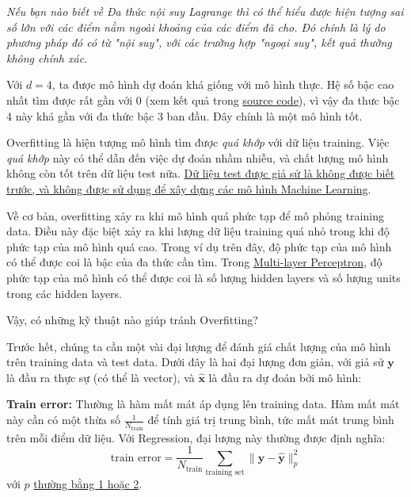 \textit{Nếu bạn nào biết về Đa thức nội suy Lagrange thì có thể hiểu được hiện tượng sai số lớn với các điểm nằm ngoài khoảng của các điểm đã cho. Đó chính là lý do phương pháp đó có từ "nội suy", với các trường hợp "ngoại suy", kết quả thường không chính xác.} 
 
Với $d = 4$, ta được mô hình dự đoán khá giống với mô hình thực. Hệ số bậc cao nhất tìm được rất gần với 0 (xem kết quả trong \href{https://github.com/tiepvupsu/tiepvupsu.github.io/blob/master/assets/15_overfitting/LinReg.ipynb}{source code}), vì vậy đa thưc bậc 4 này khá gần với đa thức bậc 3 ban đầu. Đây chính là một mô hình tốt. 
 
Overfitting là hiện tượng mô hình tìm được \textit{quá khớp} với dữ liệu training. Việc \textit{quá khớp} này có thể dẫn đến việc dự đoán nhầm nhiễu, và chất lượng mô hình không còn tốt trên dữ liệu test nữa. \href{http://machinelearningcoban.com/general/2017/02/06/featureengineering/#main-algorithms}{Dữ liệu test được giả sử là không được biết trước, và không được sử dụng để xây dựng các mô hình Machine Learning}. 
 
Về cơ bản, overfitting xảy ra khi mô hình quá phức tạp để mô phỏng training data. Điều này đặc biệt xảy ra khi lượng dữ liệu training quá nhỏ trong khi độ phức tạp của mô hình quá cao. Trong ví dụ trên đây, độ phức tạp của mô hình có thể được coi là bậc của đa thức cần tìm. Trong \href{http://machinelearningcoban.com/2017/02/24/mlp/}{Multi-layer Perceptron}, độ phức tạp của mô hình có thể được coi là số lượng hidden layers và số lượng units trong các hidden layers. 
 
Vậy, có những kỹ thuật nào giúp tránh Overfitting? 
 
 Trước hết, chúng ta cần một vài đại lượng để đánh giá chất lượng của mô hình trên training data và test data. Dưới đây là hai đại lượng đơn giản, với giả sử $\mathbf{y}$ là đầu ra thực sự (có thể là vector), và $\mathbf{\hat{x}}$ là đầu ra dự đoán bởi mô hình: 
 
\textbf{Train error:} Thường là hàm mất mát áp dụng lên training data. Hàm mất mát này cần có một thừa số $\frac{1}{N_{\text{train}}} $ để tính giá trị trung bình, tức mất mát trung bình trên mỗi điểm dữ liệu. Với Regression, đại lượng này thường được định nghĩa: 
\begin{equation*} 
\text{train error}= \frac{1}{N_{\text{train}}} \sum_{\text{training set}} \|\mathbf{y} - \mathbf{\hat{y}}\|_p^2 
\end{equation*} 
với $p$ \href{http://machinelearningcoban.com/math/#mot-so-chuan-thuong-dung}{thường bằng 1 hoặc 2}. 
 
